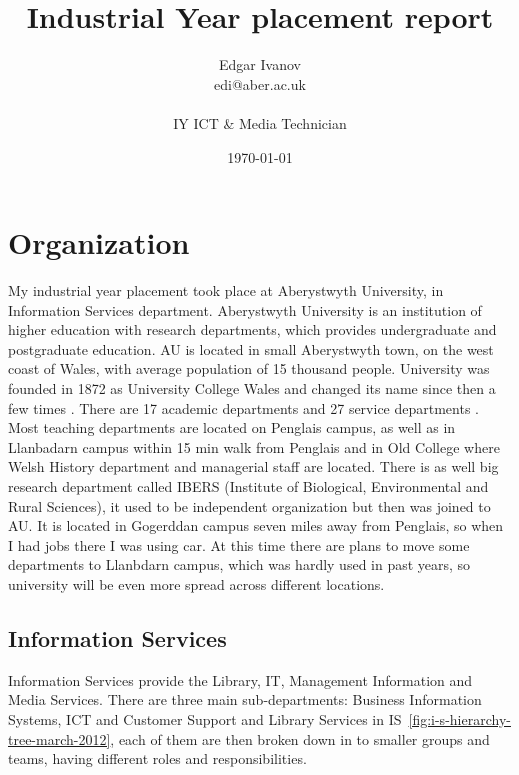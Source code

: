 \documentclass[10pt,a4paper,headinclude=true]{report}
\begin{document}
\onehalfspacing
\title{Industrial Year placement report}
\author{Edgar Ivanov\\ edi@aber.ac.uk \\ \\ IY ICT \& Media Technician}
\date{\today}

\maketitle
\tableofcontents

\chapter{Organization}
My industrial year placement took place at Aberystwyth University, in Information Services department. Aberystwyth University is an institution of higher education with research departments, which provides undergraduate and postgraduate education. AU is located in small Aberystwyth town, on the west coast of Wales, with average population of 15 thousand people. University was founded in 1872 as University College Wales and changed its name since then a few times \cite{History}.
There are 17 academic departments and 27 service departments \cite{Departments} \cite{Departments2}. Most teaching departments are located on Penglais campus, as well as in Llanbadarn campus within 15 min walk from Penglais and in Old College where Welsh History department and managerial staff are located. There is as well big research department called IBERS (Institute of Biological, Environmental and Rural Sciences), it used to be independent organization but then was joined to AU. It is located in Gogerddan campus seven miles away from Penglais, so when I had jobs there I was using car. At this time there are plans to move some departments to Llanbdarn campus, which was hardly used in past years, so university will be even more spread across different locations.

\section{Information Services}
Information Services provide the Library, IT, Management Information and Media Services. There are three main sub-departments: Business Information Systems, ICT and Customer Support and Library Services in IS~\ref{fig:i-s-hierarchy-tree-march-2012}, each of them are then broken down in to smaller groups and teams, having different roles and responsibilities.
\end{document}
